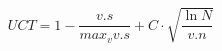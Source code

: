 \documentclass[11pt]{article}
\begin{document}
\begin{equation}
    UCT = 1 - \frac{v.s}{max_v v.s} + C \cdot \sqrt{\frac{\ln N}{v.n}}
\end{equation}




\end{document}
